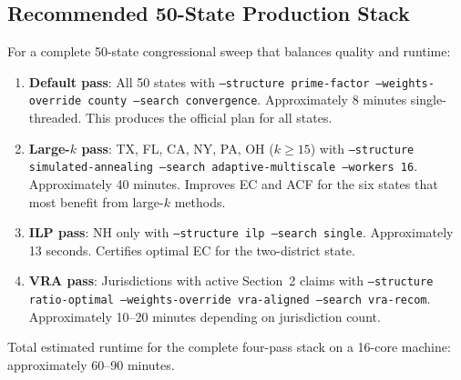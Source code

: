 \subsection{Recommended 50-State Production Stack}

For a complete 50-state congressional sweep that balances quality and runtime:

\begin{enumerate}
  \item \textbf{Default pass}: All 50 states with
        \texttt{--structure prime-factor --weights-override county --search convergence}.
        Approximately 8 minutes single-threaded.
        This produces the official plan for all states.

  \item \textbf{Large-$k$ pass}: TX, FL, CA, NY, PA, OH ($k \geq 15$) with
        \texttt{--structure simulated-annealing --search adaptive-multiscale --workers 16}.
        Approximately 40 minutes.
        Improves EC and ACF for the six states that most benefit from
        large-$k$ methods.

  \item \textbf{ILP pass}: NH only with
        \texttt{--structure ilp --search single}.
        Approximately 13 seconds.
        Certifies optimal EC for the two-district state.

  \item \textbf{VRA pass}: Jurisdictions with active Section~2 claims with
        \texttt{--structure ratio-optimal --weights-override vra-aligned --search vra-recom}.
        Approximately 10--20 minutes depending on jurisdiction count.
\end{enumerate}

Total estimated runtime for the complete four-pass stack on a 16-core machine:
approximately 60--90 minutes.
